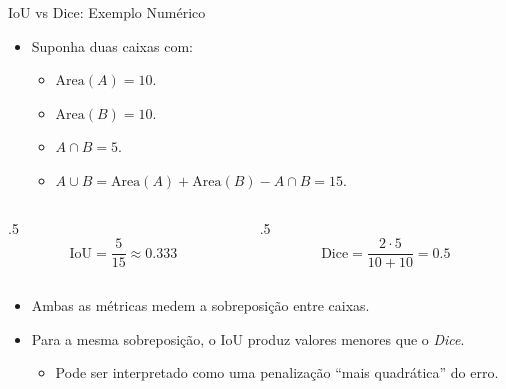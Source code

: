 \documentclass[aspectratio=169,xcolor=dvipsnames]{beamer}
\begin{document}
\begin{frame}{IoU vs Dice: Exemplo Numérico}
\begin{itemize}
    \item Suponha duas caixas com:
    \begin{itemize}
        \item $\mathrm{Area}(A) = 10$.
        \item $\mathrm{Area}(B) = 10$.
        \item $A \cap B = 5$.
        \item $A \cup B = \mathrm{Area}(A) + \mathrm{Area}(B) - A \cap B = 15$.
    \end{itemize}
\end{itemize}
\vspace{0.2em}
\begin{columns}
    \begin{column}{.5\linewidth}
        \begin{equation*}
            \mathrm{IoU} = \frac{5}{15} \approx 0.333
        \end{equation*}
    \end{column}
    \begin{column}{.5\linewidth}
        \begin{equation*}
            \mathrm{Dice} = \frac{2 \cdot 5}{10 + 10} = 0.5
        \end{equation*}
    \end{column}
\end{columns}
\vspace{0.6em}
\begin{itemize}
    \item Ambas as métricas medem a sobreposição entre caixas.
    \item Para a mesma sobreposição, o IoU produz valores menores que o \textit{Dice}.
    \begin{itemize}
        \item Pode ser interpretado como uma penalização ``mais quadrática'' do erro.
    \end{itemize}
\end{itemize}
\end{frame}
\end{document}
